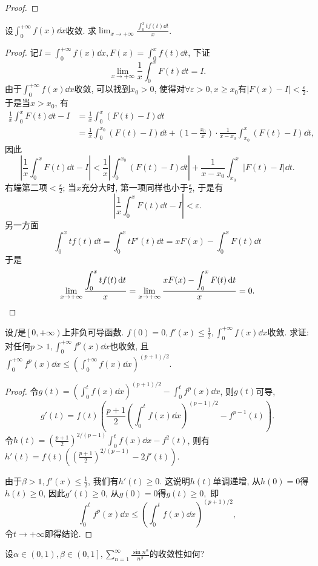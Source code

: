 \begin{quizb}
\begin{proof}
\end{proof}
\woe 设\(\int_{0}^{+\infty}f(x)\dd x\)收敛. 求\(\lim_{x\rightarrow+\infty}\frac{\displaystyle\int_{0}^{x}tf(t)\dd t}{x}\).
\begin{proof}
记\(I=\int_{0}^{+\infty}f(x)\dd x,F(x)=\int_{0}^{x}f(t)\dd t\), 下证\[\lim_{x\rightarrow+\infty}\frac{1}{x}\int_{0}^{x}F(t)\dd t=I.\]由于\(\int_{0}^{+\infty}f(x)\dd x\)收敛, 可以找到\(x_0>0\), 使得对\(\forall \varepsilon>0,x\geqslant x_0\)有\(\left|F(x)-I\right|<\frac{\varepsilon}{2}\). 于是当\(x>x_0\), 有\[\begin{split}
\frac{1}{x}\int_{0}^{x}F(t)\dd t-I&=\frac{1}{x}\int_{0}^{x}\left(F(t)-I\right)\dd t\\&=\frac{1}{x}\int_{0}^{x_0}\left(F(t)-I\right)\dd t+\left(1-\frac{x_0}{x}\right)\cdot\frac{1}{x-x_0}\int_{x_0}^{x}\left(F(t)-I\right)\dd t,
\end{split}\]因此\[\left|\frac{1}{x}\int_{0}^{x}F(t)\dd t-I\right|<\frac{1}{x}\left|\int_{0}^{x_0}\left(F(t)-I\right)\dd t\right|+\frac{1}{x-x_0}\int_{x_0}^{x}\left|F(t)-I\right|\dd t.\]右端第二项\(<\frac{\varepsilon}{2}\); 当\(x\)充分大时, 第一项同样也小于\(\frac{\varepsilon}{2}\), 于是有\[\left|\frac{1}{x}\int_{0}^{x}F(t)\dd t-I\right|<\varepsilon.\]另一方面\[\int_{0}^{x}tf(t)\dd t=\int_{0}^{x}tF'(t)\dd t=xF(x)-\int_{0}^{x}F(t)\dd t\]于是\[\lim_{x\rightarrow+\infty}\frac{\displaystyle\int_{0}^{x}tf(t)\,\mathrm{d} t}{x}=\lim_{x\rightarrow+\infty}\frac{\displaystyle xF(x)-\int_{0}^{x}F(t)\,\mathrm{d} t}{x}=0.\qedhere\]
\end{proof}
\woe 设\(f\)是\(\left[0,+\infty\right)\)上非负可导函数. \(f(0)=0,f'(x)\leqslant\frac{1}{2},\int_{0}^{+\infty}f(x)\dd x\)收敛. 求证: 对任何\(p>1,\int_{0}^{+\infty}f^p(x)\dd x\)也收敛, 且\(\int_{0}^{+\infty}f^p(x)\dd x\leqslant\left(\int_{0}^{+\infty}f(x)\dd x\right)^{(p+1)/2}\).
\begin{proof}
令\(g(t)=\left(\int_{0}^{t}f(x)\dd x\right)^{(p+1)/2}-\int_{0}^{t}f^p(x)\dd x\), 则\(g(t)\)可导,\[g'(t)=f(t)\left(\frac{p+1}{2}\left(\int_{0}^{t}f(x)\dd x\right)^{(p-1)/2}-f^{p-1}(t)\right).\]令\(h(t)=\left(\frac{p+1}{2}\right)^{2/(p-1)}\int_{0}^{t}f(x)\dd x-f^2(t)\), 则有\(h'(t)=f(t)\left(\left(\frac{p+1}{2}\right)^{2/(p-1)}-2f'(t)\right)\).

由于\(\beta>1,f'(x)\leqslant\frac{1}{2}\), 我们有\(h'(t)\geqslant 0\). 这说明\(h(t)\)单调递增, 从\(h(0)=0\)得\(h(t)\geqslant 0\), 因此\(g'(t)\geqslant 0\), 从\(g(0)=0\)得\(g(t)\geqslant 0,\) 即\[\int_{0}^{t}f^p(x)\dd x\leqslant\left(\int_{0}^{t}f(x)\dd x\right)^{(p+1)/2},\]令\(t\rightarrow+\infty\)即得结论.
\end{proof}
\woe 设\(\alpha\in(0,1),\beta\in\left(0,1\right],\sum_{n=1}^{\infty}\frac{\sin n^\alpha}{n^\beta}\)的收敛性如何?
\begin{solution}


\end{solution}
\end{quizb}
